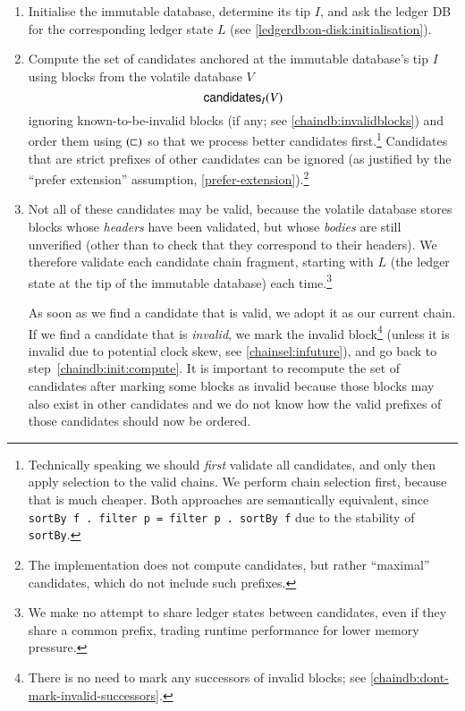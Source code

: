 \begin{enumerate}

\item
\label{chaindb:init:imm}
Initialise the immutable database, determine its tip $I$, and ask the ledger DB
for the corresponding ledger state $L$ (see
\cref{ledgerdb:on-disk:initialisation}).

\item Compute the set of candidates anchored at the immutable database's tip
\label{chaindb:init:compute}
$I$ using blocks from the volatile database $V$
$$\mathsf{candidates}_I(V)$$
ignoring known-to-be-invalid blocks (if any; see \cref{chaindb:invalidblocks})
and order them using $(\mathrel{\sqsubset})$  so that we process better candidates
first.\footnote{Technically speaking we should \emph{first} validate all
candidates, and only then apply selection to the valid chains. We perform chain
selection first, because that is much cheaper. Both approaches are semantically
equivalent, since \lstinline!sortBy f . filter p = filter p . sortBy f! due to
the stability of \lstinline!sortBy!.} Candidates that are strict prefixes of
other candidates can be ignored (as justified by the ``prefer extension''
assumption, \cref{prefer-extension}).\footnote{The implementation does not
compute candidates, but rather ``maximal'' candidates, which do not include such
prefixes.}

\item
\label{chaindb:init:select}
Not all of these candidates may be valid, because the volatile database stores
blocks whose \emph{headers} have been validated, but whose \emph{bodies} are
still unverified (other than to check that they correspond to their headers).
We therefore validate each candidate chain fragment, starting with $L$ (the
ledger state at the tip of the immutable database) each time.\footnote{We make
no attempt to share ledger states between candidates, even if they share a
common prefix, trading runtime performance for lower memory pressure.}

As soon as we find a candidate that is valid, we adopt it as our current chain.
If we find a candidate that is \emph{invalid}, we mark the invalid
block\footnote{There is no need to mark any successors of invalid blocks; see
\cref{chaindb:dont-mark-invalid-successors}.} (unless it is invalid due to
potential clock skew, see \cref{chainsel:infuture}), and go back to
step~\ref{chaindb:init:compute}. It is important to recompute the set of
candidates after marking some blocks as invalid because those blocks may also
exist in other candidates and we do not know how the valid prefixes of those
candidates should now be ordered.

\end{enumerate}

